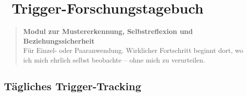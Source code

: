 
\section*{\textcolor{ctmmBlue}{\faSearch~Trigger-Forschungstagebuch}}

\begin{quote}
\textbf{\textcolor{ctmmBlue}{Modul zur Mustererkennung, Selbstreflexion und Beziehungssicherheit}}\\
Für Einzel- oder Paaranwendung. Wirklicher Fortschritt beginnt dort, wo ich mich ehrlich selbst beobachte -- ohne mich zu verurteilen.
\end{quote}

\subsection*{\textcolor{ctmmBlue}{Tägliches Trigger-Tracking}}

